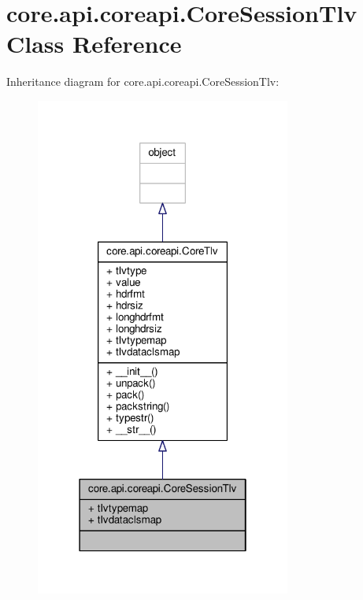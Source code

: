\hypertarget{classcore_1_1api_1_1coreapi_1_1_core_session_tlv}{\section{core.\+api.\+coreapi.\+Core\+Session\+Tlv Class Reference}
\label{classcore_1_1api_1_1coreapi_1_1_core_session_tlv}
}


Inheritance diagram for core.\+api.\+coreapi.\+Core\+Session\+Tlv\+:
\nopagebreak
\begin{figure}[H]
\begin{center}
\leavevmode
\includegraphics[width=238pt]{classcore_1_1api_1_1coreapi_1_1_core_session_tlv__inherit__graph}
\end{center}
\end{figure}


